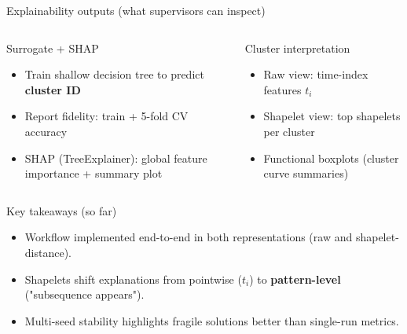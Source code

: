 \documentclass[aspectratio=169]{beamer}
\begin{document}
\begin{frame}{Explainability outputs (what supervisors can inspect)}
  \begin{columns}[T,onlytextwidth]
    \begin{block}{Surrogate + SHAP}
      \begin{itemize}
        \item Train shallow decision tree to predict \textbf{cluster ID}
        \item Report fidelity: train + 5-fold CV accuracy
        \item SHAP (TreeExplainer): global feature importance + summary plot
      \end{itemize}
    \end{block}

    \begin{block}{Cluster interpretation}
      \begin{itemize}
        \item Raw view: time-index features $t_i$
        \item Shapelet view: top shapelets per cluster
        \item Functional boxplots (cluster curve summaries)
      \end{itemize}
    \end{block}
  \end{columns}
\end{frame}

\begin{frame}{Key takeaways (so far)}
  \begin{itemize}
    \item Workflow implemented end-to-end in both representations (raw and shapelet-distance).
    \item Shapelets shift explanations from pointwise ($t_i$) to \textbf{pattern-level} ("subsequence appears").
    \item Multi-seed stability highlights fragile solutions better than single-run metrics.
  \end{itemize}
\end{frame}
\end{document}
